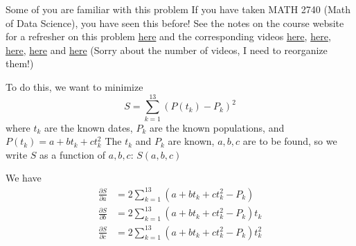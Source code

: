 \documentclass[aspectratio=169]{beamer}
\begin{document}
\begin{frame}{Some of you are familiar with this problem}
If you have taken MATH 2740 (Math of Data Science), you have seen this before!
\vfill
See the notes on the course website for a refresher on this problem \href{https://julien-arino.github.io/math-of-data-science/SLIDES/MATH2740-slides-04-Canada-census.html}{here} and the corresponding videos \href{https://youtu.be/c8MCbAL0NFs?si=e2Q8ZgkKEyooHpo3}{here}, \href{https://youtu.be/9hJchea1j8o?si=q-5ZM2sOUu5DSmKu}{here}, \href{https://youtu.be/3_6HEY4CmbA?si=xAcLjKS86C4FMUCp}{here}, \href{https://youtu.be/yT7aGJfRWBA?si=GrVC0mKkUkE-W2s0}{here} and \href{https://youtu.be/v-z-QaUwdEo?si=RQ6dZYAXz_68Vi-9}{here}
\vfill
(Sorry about the number of videos, I need to reorganize them!)
\end{frame}

\begin{frame}
To do this, we want to minimize
\[
S=\sum_{k=1}^{13} \left(P(t_k)-P_k\right)^2
\]
where $t_k$ are the known dates, $P_k$ are the known populations, and $P(t_k)=a+bt_k+ct_k^2$
\vfill
The $t_k$ and $P_k$ are known, $a,b,c$ are to be found, so we write $S$ as a function of $a,b,c$: $S(a,b,c)$
\end{frame}




\begin{frame}
We have
\begin{align*}
\frac{\partial S}{\partial a} &= 2\sum_{k=1}^{13}(a+bt_k+ct_k^2-P_k) \\
\frac{\partial S}{\partial b} &= 2\sum_{k=1}^{13}(a+bt_k+ct_k^2-P_k)t_k \\
\frac{\partial S}{\partial c} &= 2\sum_{k=1}^{13}(a+bt_k+ct_k^2-P_k)t_k^2
\end{align*}
\end{frame}

\end{document}
